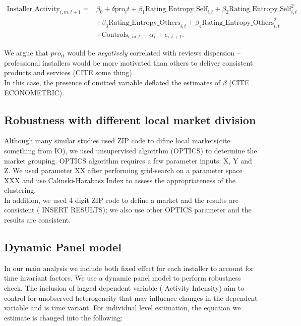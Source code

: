 \documentclass[msom,blindrev]{informs3}
\begin{document}
\begin{align}  \nonumber
\text{Installer\_Activity}_{i,m,t+1}=&\beta_{0}+\delta \text{pro}_it+\beta_{1} \text{Rating\_Entropy\_Self}_{i,t}+\beta_{2} \text{Rating\_Entropy\_Self}_{i,t}^ {2}
\\ \nonumber
&+\beta_{3} \text{Rating\_Entropy\_Others}_{i,t}  +\beta_{4}\text{Rating\_Entropy\_Others}_{i,t}^{2} \\
&+ \text{Controls}_{i,m,t}+ \alpha_{i} + \epsilon_{i,t+1}.
\end{align}

We argue that $pro_{it}$ would be \textit{negatively} correlated with reviews dispersion -- professional installers would be more motivated than others to deliver consistent products and services (CITE some thing).  \\

In this case, the presence of omitted variable deflated the estimates of $\beta$ (CITE ECONOMETRIC). \\


\subsection{Robustness with different local market division}
Although many similar studies used ZIP code to difine local markets(cite something from IO), we used unsupervised algorithm (OPTICS) to determine the market grouping. OPTICS algorithm requires a few parameter inputs: X, Y and Z. We used parameter XX after performing grid-search on a parameter space XXX and use Calinski-Harabasz Index to assess the appropriateness of the clustering.  \\ In addition, we used 4 digit ZIP code to define a market and the results are consistent ( INSERT RESULTS); we also use other OPTICS parameter and the results are consistent.  \\

\subsection{Dynamic Panel model}
In our main analysis we include both fixed effect for each installer to account for time invariant factors. We use a dynamic panel model to perform robustness check. The inclusion of lagged dependent variable ( Activity Intensity) aim to control for unobserved heterogeneity that may influence changes in the dependent variable and is time variant. For individual level estimation, the equation we estimate is changed into the following:
\end{document}
